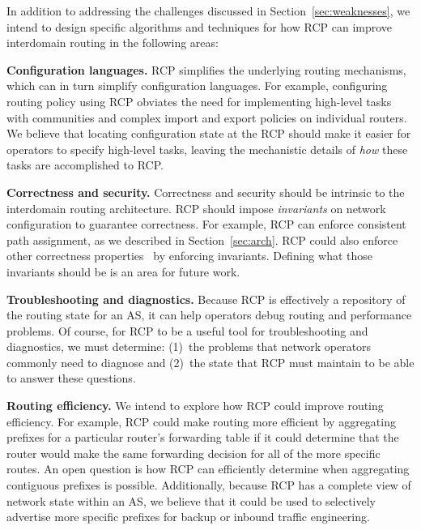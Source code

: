 \label{sec:conclusion}

In addition to addressing the challenges discussed in
Section~\ref{sec:weaknesses}, we intend to design specific algorithms
and techniques for how RCP can improve interdomain routing in the
following areas:


{\bf Configuration languages.} RCP simplifies the underlying
routing mechanisms, which can in turn simplify configuration languages.
For example, configuring routing policy using RCP obviates the need for
implementing high-level tasks with communities and complex import and
export policies on individual routers.  We believe that locating
configuration state at the RCP should make it easier for operators to
specify high-level tasks, leaving the mechanistic details of {\em how}
these tasks are accomplished to RCP.  

{\bf Correctness and security.}  Correctness and security should be
intrinsic to the interdomain routing architecture.  RCP should impose
{\em invariants} on network configuration to guarantee correctness.  For
example, RCP can enforce consistent path assignment, as we described in
Section~\ref{sec:arch}.  RCP could also enforce other correctness
properties~\cite{Feamster2003b} by enforcing invariants.  Defining
what those invariants should be is an area for future work.

{\bf Troubleshooting and diagnostics.} Because RCP is effectively a
 repository of the routing state
for an AS, it can help operators debug routing and performance problems.
Of course, for RCP to be a useful tool for troubleshooting and
diagnostics, we must determine: (1)~the problems that network operators
commonly need to diagnose and (2)~the state that RCP must maintain
to be able to answer these questions.

{\bf Routing efficiency.}  We intend to explore how RCP could
improve routing efficiency.  For example, RCP could make routing
more efficient by aggregating prefixes for a particular router's
forwarding table if it could determine that the router would make the
same forwarding decision for all of the more specific routes.  An open
question is how RCP can efficiently determine when
aggregating contiguous prefixes is possible.  Additionally, because
RCP has a complete view of network state within an AS, we believe
that it could be used to selectively advertise more specific prefixes
for backup or inbound traffic engineering.



